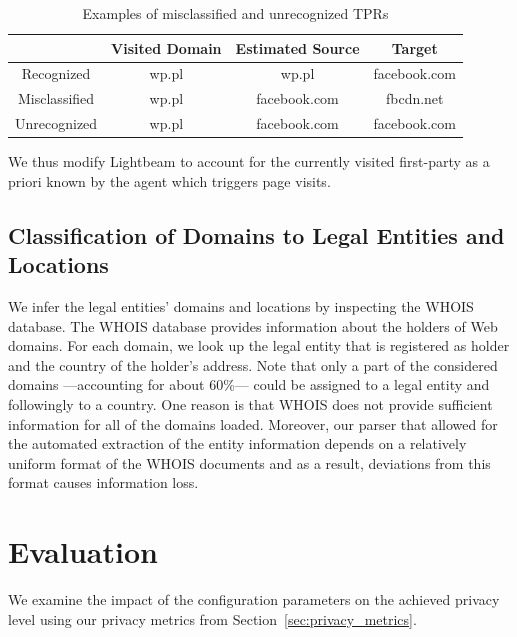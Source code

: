 \documentclass[compsoc, conference, letterpaper, 10pt, times]{IEEEtran}
\begin{document}
\begin{table}
\centering
\footnotesize
\begin{tabular}{|c|c c c|}

\hline
& Visited Domain & Estimated Source & Target \\
\hline
Recognized & wp.pl & wp.pl & facebook.com \\
Misclassified & wp.pl & facebook.com & fbcdn.net \\
Unrecognized & wp.pl & facebook.com & facebook.com \\
\hline
\end{tabular}
\caption{Examples of misclassified and unrecognized TPRs}
\label{table:false_positive_examples}
\end{table}


We thus modify Lightbeam to account for the currently visited first-party as a priori known by the agent which triggers page visits. 








\subsection{Classification of Domains to Legal Entities and Locations}
We infer the legal entities' domains and locations by inspecting the WHOIS database. The WHOIS database provides information about the holders of Web domains. For each domain, we look up the legal entity that is registered as holder and the country of the holder's address. Note that only a part of the considered domains ---accounting for about 60\%--- could be assigned to a legal entity and followingly to a country. One reason is that WHOIS does not provide sufficient information for all of the domains loaded. Moreover, our parser that allowed for the automated extraction of the entity information depends on a relatively uniform format of the WHOIS documents and as a result, deviations from this format causes information loss.

\section{Evaluation}
\label{sec:evaluation}
We examine the impact of the configuration parameters on the achieved privacy level using our privacy metrics from Section~\ref{sec:privacy_metrics}. 
\end{document}
